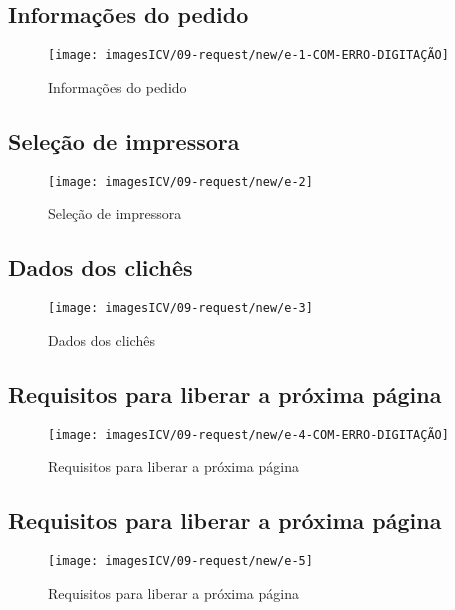 \usepackage{graphicx}
\usepackage{wasysym}
\newpage
\thispagestyle{fancy}
\vspace{\fill}

\subsection{\small Informações do pedido}
\begin{figure}
    \centering
    \texttt{[image: imagesICV/09-request/new/e-1-COM-ERRO-DIGITAÇÃO]}
    \caption{Informações do pedido}
\end{figure}
\newpage

\thispagestyle{fancy}
\vspace{\fill}
\subsection{\small Seleção de impressora}
\begin{figure}
    \centering
    \texttt{[image: imagesICV/09-request/new/e-2]}
    \caption{Seleção de impressora}
\end{figure}
\newpage

\thispagestyle{fancy}
\vspace{\fill}
\subsection{\small Dados dos clichês}
\begin{figure}
    \centering
    \texttt{[image: imagesICV/09-request/new/e-3]}
    \caption{Dados dos clichês}
\end{figure}
\newpage

\thispagestyle{fancy}
\vspace{\fill}
\subsection{\small Requisitos para liberar a próxima página}
\begin{figure}
    \centering
    \texttt{[image: imagesICV/09-request/new/e-4-COM-ERRO-DIGITAÇÃO]}
    \caption{Requisitos para liberar a próxima página}
\end{figure}
\newpage

\thispagestyle{fancy}
\vspace{\fill}
\subsection{\small Requisitos para liberar a próxima página}
\begin{figure}
    \centering
    \texttt{[image: imagesICV/09-request/new/e-5]}
    \caption{Requisitos para liberar a próxima página}
\end{figure}
\newpage

